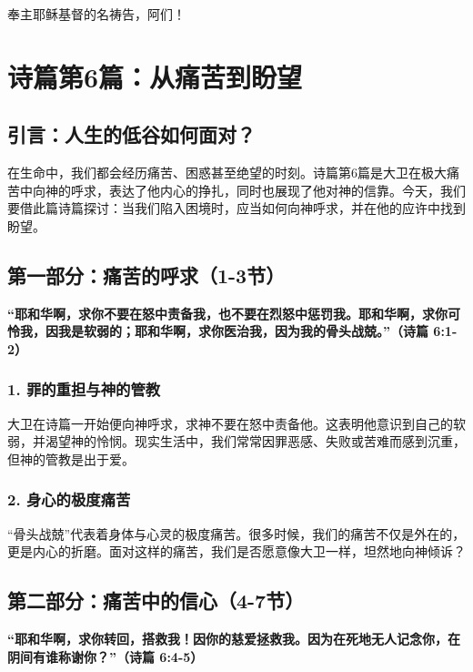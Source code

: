 \documentclass[a4paper, 12pt]{article}
\begin{document}
奉主耶稣基督的名祷告，阿们！

\newpage
\section{诗篇第6篇：从痛苦到盼望}

\subsection*{引言：人生的低谷如何面对？}

在生命中，我们都会经历痛苦、困惑甚至绝望的时刻。诗篇第6篇是大卫在极大痛苦中向神的呼求，表达了他内心的挣扎，同时也展现了他对神的信靠。今天，我们要借此篇诗篇探讨：当我们陷入困境时，应当如何向神呼求，并在他的应许中找到盼望。

\subsection*{第一部分：痛苦的呼求（1-3节）}

\textbf{“耶和华啊，求你不要在怒中责备我，也不要在烈怒中惩罚我。耶和华啊，求你可怜我，因我是软弱的；耶和华啊，求你医治我，因为我的骨头战兢。”（诗篇 6:1-2）}

\subsubsection*{1. 罪的重担与神的管教}

大卫在诗篇一开始便向神呼求，求神不要在怒中责备他。这表明他意识到自己的软弱，并渴望神的怜悯。现实生活中，我们常常因罪恶感、失败或苦难而感到沉重，但神的管教是出于爱。

\subsubsection*{2. 身心的极度痛苦}

“骨头战兢”代表着身体与心灵的极度痛苦。很多时候，我们的痛苦不仅是外在的，更是内心的折磨。面对这样的痛苦，我们是否愿意像大卫一样，坦然地向神倾诉？

\subsection*{第二部分：痛苦中的信心（4-7节）}

\textbf{“耶和华啊，求你转回，搭救我！因你的慈爱拯救我。因为在死地无人记念你，在阴间有谁称谢你？”（诗篇 6:4-5）}
\end{document}
